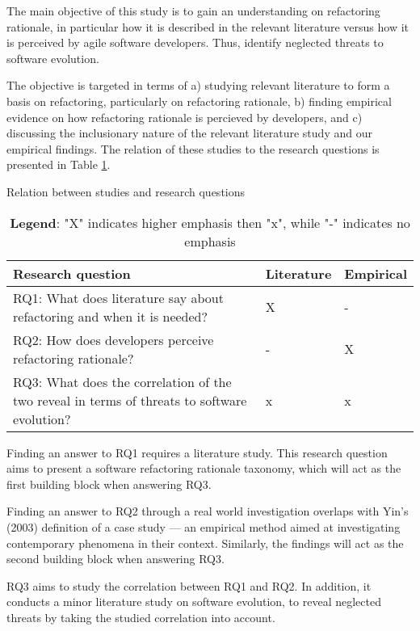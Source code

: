 The main objective of this study is to gain an understanding on refactoring rationale, in particular how it is described in the relevant literature versus how it is perceived by agile software developers. Thus, identify neglected threats to software evolution. 

The objective is targeted in terms of a) studying relevant literature to form a basis on refactoring, particularly on refactoring rationale, b) finding empirical evidence on how refactoring rationale is percieved by developers, and c) discussing the inclusionary nature of the relevant literature study and our empirical findings. The relation of these studies to the research questions is presented in Table \ref{table:researchQuestions}.

\begin{table}[ht!]
\centering
\caption{Relation between studies and research questions}
\label{table:researchQuestions}
    \begin{tabular}{ p{10cm} p{2cm} p{2cm}  }
     \hline
     \textbf{Research question}  &\textbf{Literature}  &\textbf{Empirical}  \\
     \hline
     RQ1: What does literature say about refactoring and when it is needed?                         &X      &-  \\
     \hline
     RQ2: How does developers perceive refactoring rationale?                                       &-      &X  \\
     \hline
     RQ3: What does the correlation of the two reveal in terms of threats to software evolution?    &x      &x  \\
     \hline
    \end{tabular}
\centering
\caption*{  \textbf{Legend}: "X" indicates higher emphasis then "x", while "-" indicates no emphasis}
\end{table}

Finding an answer to RQ1 requires a literature study. This research question aims to present a software refactoring rationale taxonomy, which will act as the first building block when answering RQ3.

Finding an answer to RQ2 through a real world investigation overlaps with Yin's (2003) definition of a case study --- an empirical method aimed at investigating contemporary phenomena in their context. Similarly, the findings will act as the second building block when answering RQ3.

RQ3 aims to study the correlation between RQ1 and RQ2. In addition, it conducts a minor literature study on software evolution, to reveal neglected threats by taking the studied correlation into account.

